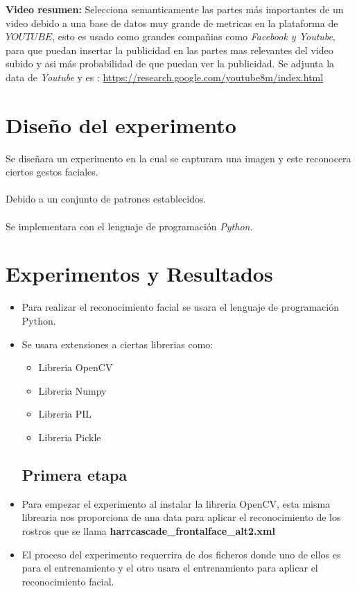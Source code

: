 \documentclass{vgtc}                          %
\begin{document}
\textbf{Video resumen: }
Selecciona semanticamente las partes más importantes de un video
debido a una base de datos muy grande de metricas en la plataforma 
de $YOUTUBE$, esto es usado como grandes compañias como \textit{Facebook y Youtube}, para que puedan insertar la publicidad
en las partes mas relevantes del video subido y asi más probabilidad
de que puedan ver la publicidad.
\newline
\newline
Se adjunta la data de \textit{Youtube} y es : \newline \newline
\url{https://research.google.com/youtube8m/index.html}


\section{Diseño del experimento}

Se diseñara un experimento en la cual se capturara una imagen
y este reconocera ciertos gestos faciales.
\\
\\
Debido a un conjunto de patrones establecidos.
\\
\\
Se implementara con el lenguaje de programación \textit{Python.}


\section{Experimentos y Resultados}

\begin{itemize}

\item Para realizar el reconocimiento facial se usara el lenguaje de programación Python.

\item Se usara extensiones a ciertas librerias como:
	
	\begin{itemize}
	\item Libreria OpenCV
	\item Libreria Numpy
	\item Libreria PIL
	\item Libreria Pickle
	\end{itemize}

\subsection{Primera etapa}

\item Para empezar el experimento al instalar la libreria OpenCV, esta misma librearia nos proporciona de una data para aplicar el reconocimiento de los rostros que se llama \textbf{harrcascade\_frontalface\_alt2.xml}

\item El proceso del experimento requerrira de dos ficheros donde uno de ellos es para el entrenamiento y el otro usara el entrenamiento para aplicar el reconocimiento facial.

\end{itemize}
\end{document}
